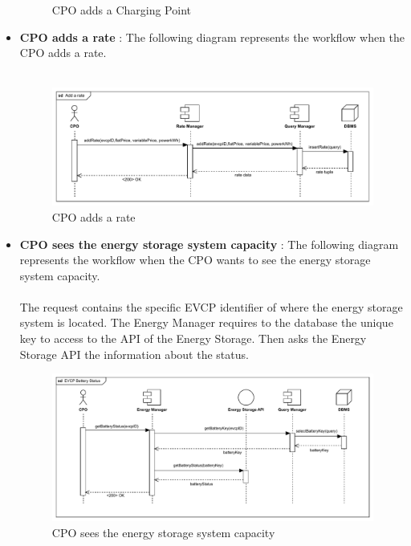 \begin{itemize}
\begin{figure}[H]
              \caption{CPO adds a Charging Point}
          \end{figure}
    \item \textbf{CPO adds a rate} : The following diagram represents the workflow when the CPO adds a rate.\\
          \\
          \begin{figure}[H]
              \centering
              \includegraphics[scale=0.80]{src/runtimeView/CPMS_addRate.pdf}
              \caption{CPO adds a rate}
          \end{figure}
          \pagebreak
    \item \textbf{CPO sees the energy storage system capacity} : The following diagram represents the workflow when the CPO wants to see the energy storage system capacity.\\
          \\ The request contains the specific EVCP identifier of where the energy storage system is located. The Energy Manager requires to the database the unique key to access
          to the API of the Energy Storage. Then asks the Energy Storage API the information about the status.
          \begin{figure}[H]
              \centering
              \includegraphics[scale=0.75]{src/runtimeView/CPMS_batteryCapacity.pdf}
              \caption{CPO sees the energy storage system capacity}
          \end{figure}

\end{itemize}
